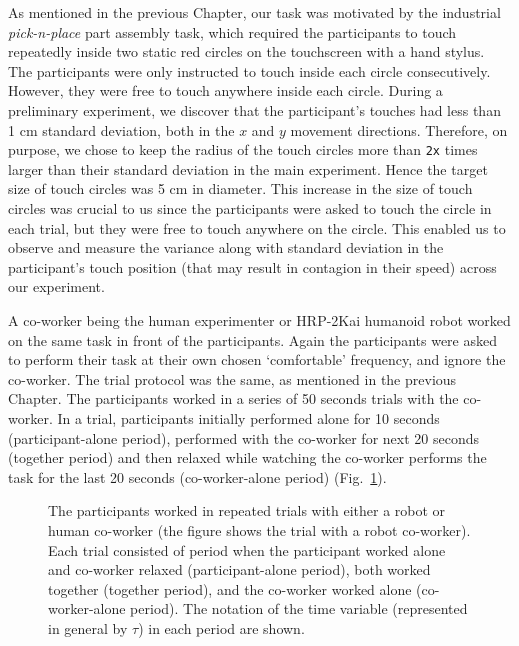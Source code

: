 As mentioned in the previous Chapter, our task was motivated by the industrial \textit{pick-n-place} part assembly task, which required the participants to touch repeatedly inside two static red circles on the touchscreen with a hand stylus. The participants were only instructed to touch inside each circle consecutively. However, they were free to touch anywhere inside each circle. During a preliminary experiment, we discover that the participant's touches had less than 1 cm standard deviation, both in the $x$ and $y$ movement directions. Therefore, on purpose, we chose to keep the radius of the touch circles more than \texttt{2x} times larger than their standard deviation in the main experiment. Hence the target size of touch circles was 5 cm in diameter. This increase in the size of touch circles was crucial to us since the participants were asked to touch the circle in each trial, but they were free to touch anywhere on the circle. This enabled us to observe and measure the variance along with standard deviation in the participant's touch position (that may result in contagion in their speed) across our experiment.

A co-worker being the human experimenter or HRP-2Kai humanoid robot worked on the same task in front of the participants. Again the participants were asked to perform their task at their own chosen `comfortable' frequency, and ignore the co-worker. The trial protocol was the same, as mentioned in the previous Chapter. The participants worked in a series of 50 seconds trials with the co-worker. In a trial, participants initially performed alone for 10 seconds (participant-alone period), performed with the co-worker for next 20 seconds (together period) and then relaxed while watching the co-worker performs the task for the last 20 seconds (co-worker-alone period) (Fig.~\ref{fig:trialprotocol2}).

\begin{figure}[hpt]
	\caption{The participants worked in repeated trials with either a robot or human co-worker (the figure shows the trial with a robot co-worker). Each trial consisted of period when the participant worked alone and co-worker relaxed (participant-alone period), both worked together (together period), and the co-worker worked alone (co-worker-alone period). The notation of the time variable (represented in general by $\tau$) in each period are shown.}
	\label{fig:trialprotocol2}
\end{figure}

